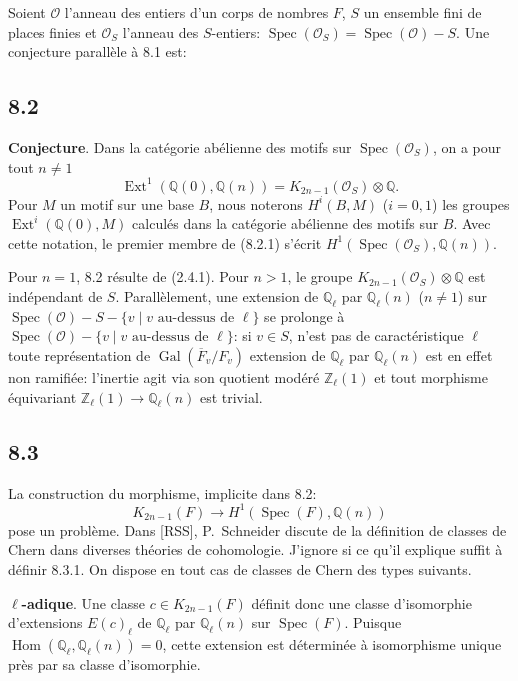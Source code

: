 \documentclass[12pt,a4paper]{article}
\theoremstyle{plain}
\theoremstyle{definition}
\theoremstyle{remark}
\DeclareMathOperator{\Hom}{Hom}
\DeclareMathOperator{\Spec}{Spec}
\DeclareMathOperator{\Gal}{Gal}
\DeclareMathOperator{\Ext}{Ext}
\newcommand{\Z}{\mathbb{Z}}
\newcommand{\Q}{\mathbb{Q}}
\begin{document}
Soient $\mathcal{O}$ l'anneau des entiers d'un corps de nombres $F$, $S$ un ensemble fini de places finies et $\mathcal{O}_S$ l'anneau des $S$-entiers: $\Spec(\mathcal{O}_S) = \Spec(\mathcal{O}) - S$.
Une conjecture parall\`ele \`a 8.1 est:

\subsection*{8.2}
\textbf{Conjecture}. Dans la cat\'egorie ab\'elienne des motifs sur $\Spec(\mathcal{O}_S)$, on a pour tout $n \neq 1$
\begin{equation*}\tag{8.2.1}
\Ext^1(\Q(0), \Q(n)) = K_{2n-1}(\mathcal{O}_S) \otimes \Q.
\end{equation*}
Pour $M$ un motif sur une base $B$, nous noterons $H^i(B, M)$ ($i = 0, 1$) les groupes $\Ext^i(\Q(0), M)$ calcul\'es dans la cat\'egorie ab\'elienne des motifs sur $B$. Avec cette notation, le premier membre de (8.2.1) s'\'ecrit $H^1(\Spec(\mathcal{O}_S), \Q(n))$.

Pour $n = 1$, 8.2 r\'esulte de (2.4.1). Pour $n > 1$, le groupe $K_{2n-1}(\mathcal{O}_S) \otimes \Q$ est ind\'ependant de $S$. Parall\`element, une extension de $\Q_\ell$ par $\Q_\ell(n)$ ($n \neq 1$) sur $\Spec(\mathcal{O}) - S - \{v \mid v \text{ au-dessus de } \ell\}$ se prolonge \`a $\Spec(\mathcal{O}) - \{v \mid v \text{ au-dessus de } \ell\}$: si $v \in S$, n'est pas de caract\'eristique $\ell$ toute repr\'esentation de $\Gal(\overline{F}_v/F_v)$ extension de $\Q_\ell$ par $\Q_\ell(n)$ est en effet non ramifi\'ee: l'inertie agit via son quotient mod\'er\'e $\Z_\ell(1)$ et tout morphisme \'equivariant $\Z_\ell(1) \to \Q_\ell(n)$ est trivial.

\subsection*{8.3}
La construction du morphisme, implicite dans 8.2:
\begin{equation*}\tag{8.3.1}
K_{2n-1}(F) \longrightarrow H^1(\Spec(F), \Q(n))
\end{equation*}
pose un probl\`eme. Dans [RSS], P.~Schneider discute de la d\'efinition de classes de Chern dans diverses th\'eories de cohomologie. J'ignore si ce qu'il explique suffit \`a d\'efinir 8.3.1. On dispose en tout cas de classes de Chern des types suivants.

\textbf{$\ell$-adique}. Une classe $c \in K_{2n-1}(F)$ d\'efinit donc une classe d'isomorphie d'extensions $E(c)_\ell$ de $\Q_\ell$ par $\Q_\ell(n)$ sur $\Spec(F)$. Puisque $\Hom(\Q_\ell, \Q_\ell(n)) = 0$, cette extension est d\'etermin\'ee \`a isomorphisme unique pr\`es par sa classe d'isomorphie.
\end{document}
